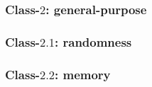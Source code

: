 %


\subsubsection{Class-$2$:   general-purpose}
\label{sec:bg:feature:2}


\subsubsection{Class-$2.1$: randomness}
\label{sec:bg:feature:2:1}

%
%
%


\subsubsection{Class-$2.2$: memory}
\label{sec:bg:feature:2:2}

